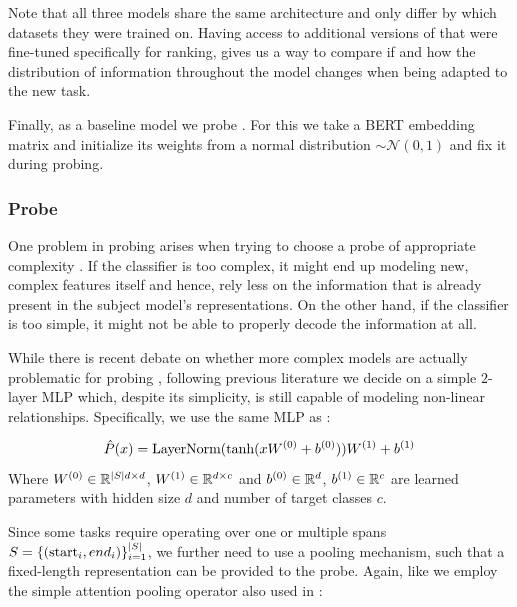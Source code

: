 Note that all three models share the same architecture and only differ by which datasets they were trained on. Having access to additional versions of  that were fine-tuned specifically for ranking, gives us a way to compare if and how the distribution of information throughout the model changes when being adapted to the new task.

Finally, as a baseline model we probe . For this we take a BERT embedding matrix and initialize its weights from a normal distribution $\sim \mathcal{N}(0, 1)$ and fix it during probing.

\subsubsection{Probe}
\label{sec:probe}
One problem in probing arises when trying to choose a probe of appropriate complexity \cite{hewitt-liang-2019-designing}. If the classifier is too complex, it might end up modeling new, complex features itself and hence, rely less on the information that is already present in the subject model's representations. On the other hand, if the classifier is too simple, it might not be able to properly decode the information at all.

While there is recent debate on whether more complex models are actually problematic for probing \cite{pimentel-etal-2020-information}, following previous literature \cite{Tenney2019WhatDY,tenney-etal-2019-bert, hewitt-liang-2019-designing} we decide on a simple $2$-layer MLP which, despite its simplicity, is still capable of modeling non-linear relationships.
Specifically, we use the same MLP as \cite{Tenney2019WhatDY}:

\begin{equation}
    \hat{P}(x) = \text{LayerNorm}(\text{tanh}(x W^{(0)} + b^{(0)})) W^{(1)} + b^{(1)}
\end{equation}
Where $W^{(0)} \in \mathbb{R}^{|S| d \times d}$,  $W^{(1)} \in \mathbb{R}^{d \times c}$ and $b^{(0)} \in \mathbb{R}^{d}$,  $b^{(1)} \in \mathbb{R}^{c}$ are learned parameters with hidden size $d$ and number of target classes $c$.

Since some tasks require operating over one or multiple spans $S=\{(\text{start}_i, {end}_i)\}_{i=1}^{|S|}$, we further need to use a pooling mechanism, such that a fixed-length representation can be provided to the probe.
Again, like \cite{Tenney2019WhatDY} we employ the simple attention pooling operator also used in \cite{lee-etal-2017-end, lee-etal-2018-higher}:

